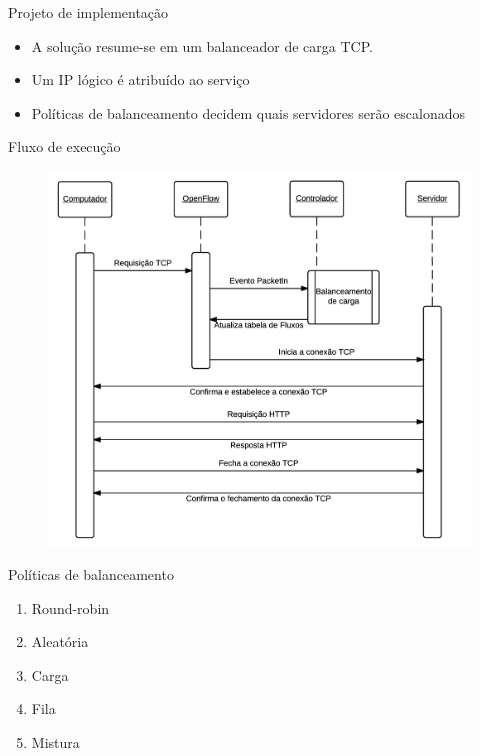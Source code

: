 \begin{frame}{Projeto de implementação}

    \begin{itemize}
        \setlength{\itemsep}{.5cm}
        \item A solução resume-se em um balanceador de carga TCP.
        \item Um IP lógico é atribuído ao serviço
        \item Políticas de balanceamento decidem quais servidores serão
            escalonados
    \end{itemize}

\end{frame}

\begin{frame}{Fluxo de execução}

    \begin{figure}[htb!]
        \centering
        \includegraphics[scale=.55]{images/balancer-workflow}
    \end{figure}
\end{frame}


\begin{frame}{Políticas de balanceamento}
    
    \begin{enumerate}
        \setlength{\itemsep}{.5cm}
        \item Round-robin
        \item Aleatória
        \item Carga
        \item Fila 
        \item Mistura
    \end{enumerate}
\end{frame}

